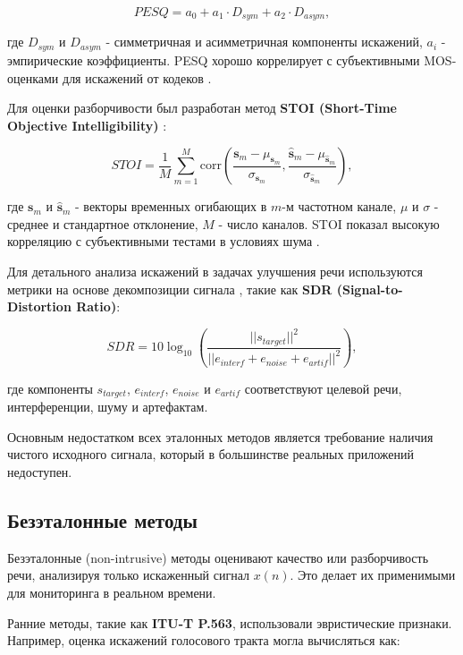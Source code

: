 \documentclass[oneside, final, 14pt]{extarticle}
\begin{document}
\begin{equation}
	PESQ = a_0 + a_1 \cdot D_{sym} + a_2 \cdot D_{asym},
\end{equation}

где $D_{sym}$ и $D_{asym}$ - симметричная и асимметричная компоненты искажений, $a_i$ - эмпирические коэффициенты. PESQ хорошо коррелирует с субъективными MOS-оценками для искажений от кодеков \cite{Sharma2016}.

Для оценки разборчивости был разработан метод \textbf{STOI (Short-Time Objective Intelligibility)} \cite{Taal2011}:

\begin{equation}
	STOI = \frac{1}{M} \sum_{m=1}^{M} \text{corr} \left( \frac{\mathbf{s}_m - \mu_{\mathbf{s}_m}}{\sigma_{\mathbf{s}_m}}, \frac{\hat{\mathbf{s}}_m - \mu_{\hat{\mathbf{s}}_m}}{\sigma_{\hat{\mathbf{s}}_m}} \right),
\end{equation}

где $\mathbf{s}_m$ и $\hat{\mathbf{s}}_m$ - векторы временных огибающих в $m$-м частотном канале, $\mu$ и $\sigma$ - среднее и стандартное отклонение, $M$ - число каналов. STOI показал высокую корреляцию с субъективными тестами в условиях шума \cite{Sharma2016}.

Для детального анализа искажений в задачах улучшения речи используются метрики на основе декомпозиции сигнала \cite{Vincent2006}, такие как \textbf{SDR (Signal-to-Distortion Ratio)}:

\begin{equation}
	SDR = 10 \log_{10} \left( \frac{||s_{target}||^2}{||e_{interf} + e_{noise} + e_{artif}||^2} \right),
\end{equation}

где компоненты $s_{target}$, $e_{interf}$, $e_{noise}$ и $e_{artif}$ соответствуют целевой речи, интерференции, шуму и артефактам.

Основным недостатком всех эталонных методов является требование наличия чистого исходного сигнала, который в большинстве реальных приложений недоступен.

\subsection{Безэталонные методы}

Безэталонные (non-intrusive) методы оценивают качество или разборчивость речи, анализируя только искаженный сигнал $x(n)$. Это делает их применимыми для мониторинга в реальном времени.

Ранние методы, такие как \textbf{ITU-T P.563}, использовали эвристические признаки. Например, оценка искажений голосового тракта могла вычисляться как:
\end{document}
